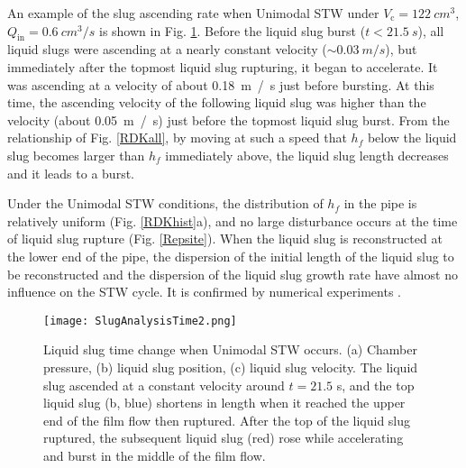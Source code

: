 \documentclass[aps,pre,preprint,groupedaddress,showkeys]{revtex4-2}
\begin{document}
An example of the slug ascending rate when Unimodal STW under $ V_ \mathrm {c} =\SI{122}{cm ^ 3} $, $ Q_ \mathrm {in} = \SI{0.6}{cm ^ 3/ s }$  is shown in Fig. \ref{SlugAnalysisTime2}.
Before the liquid slug burst ($ t < \SI{21.5}{s}$), all liquid slugs were ascending at a nearly constant velocity ($\sim \SI{0.03}{ m / s}$), but immediately after the topmost liquid slug rupturing, it began to accelerate. 
It was ascending at a velocity of about \SI{0.18}{ m / s} just before bursting.
At this time, the ascending velocity of the following liquid slug was higher than the velocity (about \SI{0.05}{ m / s}) just before the topmost liquid slug burst.
From the relationship of Fig. \ref{RDKall}, by moving at such a speed that $h_f $ below the liquid slug becomes larger than $ h_f $ immediately above, the liquid slug length decreases and it leads to a burst.

Under the Unimodal STW conditions, the distribution of $ h_f $ in the pipe is relatively uniform (Fig. \ref{RDKhist}a), and no large disturbance occurs at the time of liquid slug rupture (Fig. \ref{Repsite}).
When the liquid slug is reconstructed at the lower end of the pipe, the dispersion of the initial length of the liquid slug to be reconstructed and the dispersion of the liquid slug growth rate have almost no influence on the STW cycle. 
It is confirmed by numerical experiments \citep{kanno2018}.

\begin{figure}
\texttt{[image: SlugAnalysisTime2.png]} 
\caption{\label{SlugAnalysisTime2} Liquid slug time change when Unimodal STW occurs.
(a) Chamber pressure, (b) liquid slug position, (c) liquid slug velocity.
The liquid slug ascended at a constant velocity around $ t = 21.5 $ s, and the top liquid slug (b, blue) shortens in length when it reached the upper end of the film flow then ruptured.
After the top of the liquid slug ruptured, the subsequent liquid slug (red) rose while accelerating and burst in the middle of the film flow.}
\end{figure} 
\end{document}
